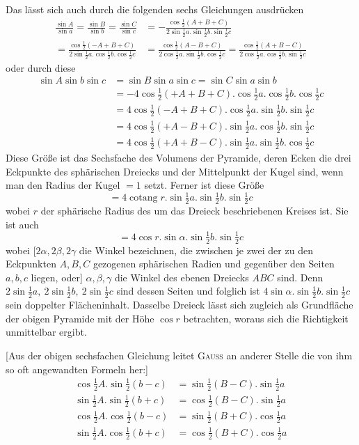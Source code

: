 %
\par
Das lässt sich auch durch die folgenden sechs Gleichungen ausdrücken
\begingroup\footnotesize
\[
\begin{aligned}
\frac{\sin A}{\sin a}=\frac{\sin B}{\sin b}=\frac{\sin C}{\sin c}&=-\frac{\cos\tfrac12(A+B+C)}{2\sin\tfrac12a.\sin\tfrac12b.\sin\tfrac12c}\\
=\frac{\cos\tfrac12(-A+B+C)}{2\sin\tfrac12a.\cos\tfrac12b.\cos\tfrac12c}&=\frac{\cos\tfrac12(A-B+C)}{2\cos\tfrac12a.\sin\tfrac12b.\cos\tfrac12c}=\frac{\cos\tfrac12(A+B-C)}{2\cos\tfrac12a.\cos\tfrac12b.\sin\tfrac12c}
\end{aligned}
\]
\endgroup
oder durch diese
\[
\begin{aligned}
\sin A\sin b\sin c&=\sin B\sin a\sin c=\sin C\sin a\sin b\\
&=-4\cos\tfrac12(+A+B+C).\cos\tfrac12a.\cos\tfrac12b.\cos\tfrac12c\\
&=4\cos\tfrac12(-A+B+C).\cos\tfrac12a.\sin\tfrac12b.\sin\tfrac12c\\
&=4\cos\tfrac12(+A-B+C).\sin\tfrac12a.\cos\tfrac12b.\sin\tfrac12c\\
&=4\cos\tfrac12(+A+B-C).\sin\tfrac12a.\sin\tfrac12b.\cos\tfrac12c
\end{aligned}
\]
Diese Größe ist das Sechsfache des Volumens der Pyramide, deren Ecken die drei Eckpunkte des sphärischen Dreiecks und der Mittelpunkt der Kugel sind, wenn man den Radius der Kugel \(=1\) setzt. Ferner ist diese Größe
\[
=4\operatorname{cotang}r.\sin\tfrac12a.\sin\tfrac12b.\sin\tfrac12c
\]
wobei \(r\) der sphärische Radius des um das Dreieck beschriebenen Kreises ist. Sie ist auch
\[
=4\cos r.\sin\alpha.\sin\tfrac12b.\sin\tfrac12c
\]
wobei [\(2\alpha,2\beta,2\gamma\) die Winkel bezeichnen, die zwischen je zwei der zu den Eckpunkten \(A,B,C\) gezogenen sphärischen Radien und gegenüber den Seiten \(a,b,c\) liegen, oder] \(\alpha,\beta,\gamma\) die Winkel des ebenen Dreiecks \(ABC\) sind. Denn \(2\sin\tfrac12a,\ 2\sin\tfrac12b,\ 2\sin\tfrac12c\) sind dessen Seiten und folglich ist \(4\sin\alpha.\sin\tfrac12b.\sin\tfrac12c\) sein doppelter Flächeninhalt. Dasselbe Dreieck lässt sich zugleich als Grundfläche der obigen Pyramide mit der Höhe \(\cos r\) betrachten, woraus sich die Richtigkeit unmittelbar ergibt.
\par{}
[Aus der obigen sechsfachen Gleichung leitet \textsc{Gauss} an anderer Stelle die von ihm so oft angewandten Formeln her:]
\[
\begin{aligned}
\cos\tfrac12A.\sin\tfrac12(b-c)&=\sin\tfrac12(B-C).\sin\tfrac12a\\
\sin\tfrac12A.\sin\tfrac12(b+c)&=\cos\tfrac12(B-C).\sin\tfrac12a\\
\cos\tfrac12A.\cos\tfrac12(b-c)&=\sin\tfrac12(B+C).\cos\tfrac12a\\
\sin\tfrac12A.\cos\tfrac12(b+c)&=\cos\tfrac12(B+C).\cos\tfrac12a
\end{aligned}
\]
